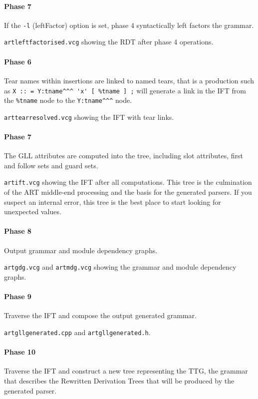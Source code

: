 \documentclass[11pt]{article}
\begin{document}
\paragraph{Phase 7}
If the {\tt -l} (leftFactor) option is set, phase 4 syntactically left factors the grammar.

 {\tt artleftfactorised.vcg} showing the RDT after phase 4 operations.

\paragraph{Phase 6}
Tear names within insertions are linked to named tears, that is a
production such as \verb+X :: = Y:tname^^^ 'x' [ %tname ] ;+ will
generate a link in the IFT from the \verb+%tname+ node to the
\verb+Y:tname^^^+ node.

 {\tt arttearresolved.vcg} showing the IFT with tear links.

\paragraph{Phase 7}
The GLL attributes are computed into the tree, including slot attributes, first and follow sets and guard sets.

 {\tt artift.vcg} showing the IFT after all
computations. This tree is the culmination of the ART middle-end
processing and the basis for the generated parsers. If you suspect an
internal error, this tree is the best place to start looking for
unexpected values.

\paragraph{Phase 8}
Output grammar and module dependency graphs.

 {\tt artgdg.vcg} and {\tt artmdg.vcg} showing the grammar and module dependency graphs.


\paragraph{Phase 9}
Traverse the IFT and compose the output generated grammar.

 {\tt artgllgenerated.cpp} and {\tt artgllgenerated.h}.

\paragraph{Phase 10}
Traverse the IFT and construct a new tree representing the TTG, the
grammar that describes the Rewritten Derivation Trees that will be
produced by the generated parser.
\end{document}
